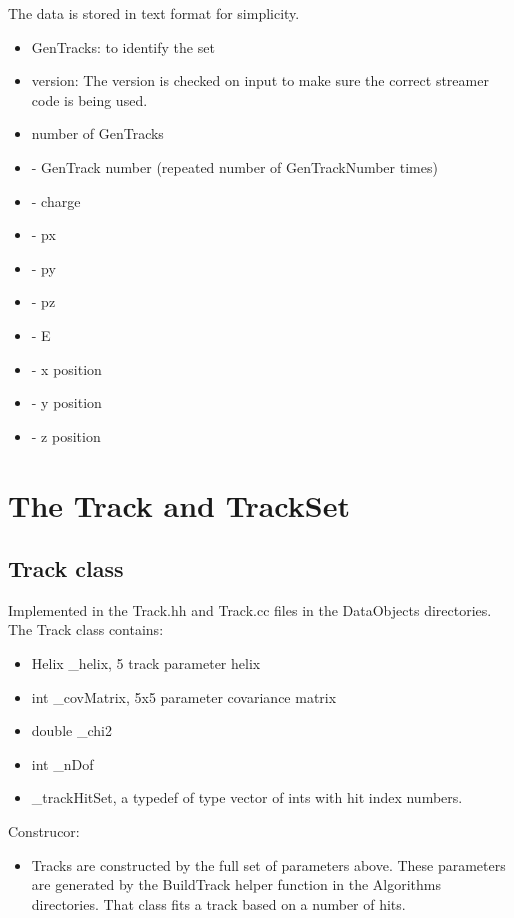 \documentclass[aps,prd,superscriptaddress,floatfix]{revtex4}
\begin{document}
The data is stored in text format for simplicity.

\begin{itemize}
\item  GenTracks: to identify the set
\item version: The version is checked on input to make sure the correct streamer code is being used.
\item number of GenTracks
\item - GenTrack number (repeated number of GenTrackNumber times)
\item - charge
\item - px
\item - py
\item - pz
\item - E
\item - x position
\item - y position
\item - z position
\end{itemize}

\section{The Track and TrackSet}
\subsection{Track class}
Implemented in the Track.hh and Track.cc files in the DataObjects directories.
\\

The Track class contains:
\begin{itemize}
\item Helix \_helix, 5 track parameter helix
\item int \_covMatrix, 5x5 parameter covariance matrix
\item double \_chi2
\item int \_nDof
\item \_trackHitSet, a typedef of type vector of ints with hit index numbers.
\end{itemize}


Construcor:
\begin{itemize}
\item Tracks are constructed by the full set of parameters above.  These parameters
are generated by the BuildTrack helper function in the Algorithms directories.
That class fits a track based on a number of hits.
\end{itemize}
\end{document}
